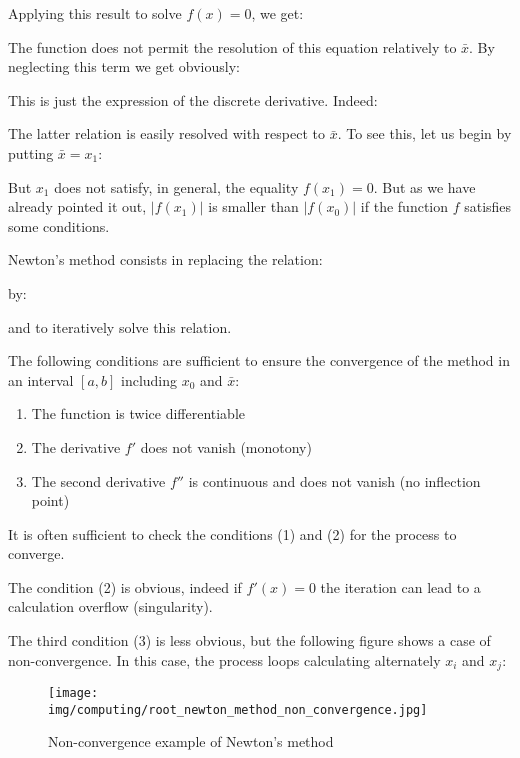 	Applying this result to solve $f(x)=0$, we get:
	
	The function does not permit the resolution of this equation relatively to $\bar{x}$. By neglecting this term we get obviously:
	
	This is just the expression of the discrete derivative. Indeed:
	 
	The latter relation is easily resolved with respect to $\bar{x}$. To see this, let us begin by putting $\bar{x}=x_1$:
	
	But $x_1$ does not satisfy, in general, the equality $f(x_1)=0$. But as we have already pointed it out, $|f(x_1)|$  is smaller than $|f(x_0)|$ if the function $f$ satisfies some conditions.
	
	Newton's method consists in replacing the relation:
	
	by:
	
	and to iteratively solve this relation.
	
	The following conditions are sufficient to ensure the convergence of the method in an interval $[a, b]$ including $x_0$ and $\bar{x}$:
	\begin{enumerate}
		\item The function is twice differentiable

		\item The derivative $f'$ does not vanish (monotony)
		\item The second derivative $f''$ is continuous and does not vanish (no inflection point)
	\end{enumerate}
	\begin{tcolorbox}[title=Remark,colframe=black,arc=10pt]
	It is often sufficient to check the conditions (1) and (2) for the process to converge.
	\end{tcolorbox}
	The condition (2) is obvious, indeed if $f'(x)=0$ the iteration can lead to a calculation overflow (singularity).
	
	The third condition (3) is less obvious, but the following figure shows a case of non-convergence. In this case, the process loops calculating alternately $x_i$ and $x_j$:
	\begin{figure}[H]
		\centering
		\texttt{[image: img/computing/root\_newton\_method\_non\_convergence.jpg]}
		\caption{Non-convergence example of Newton's method}
	\end{figure}
	
